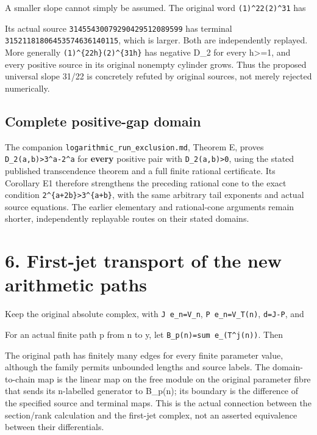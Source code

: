 A smaller slope cannot simply be assumed. The original word
\nolinkurl{(1)^22(2)^31} has


Its actual source \nolinkurl{31455430079290429512089599} has terminal
\nolinkurl{31521181806453574636140115}, which is larger. Both are
independently replayed. More generally
\texttt{(1)\^{}\{22h\}(2)\^{}\{31h\}} has negative D\_2 for every
h\textgreater=1, and every positive source in its original nonempty
cylinder grows. Thus the proposed universal slope 31/22 is concretely
refuted by original sources, not merely rejected numerically.

\subsection{Complete positive-gap domain}

The companion \nolinkurl{logarithmic_run_exclusion.md}, Theorem E,
proves \nolinkurl{D_2(a,b)>3^a-2^a} for \textbf{every} positive pair
with \nolinkurl{D_2(a,b)>0}, using the stated published transcendence
theorem and a full finite rational certificate. Its Corollary E1
therefore strengthens the preceding rational cone to the exact condition
\texttt{2\^{}\{a+2b\}\textgreater{}3\^{}\{a+b\}}, with the same
arbitrary tail exponents and actual source equations. The earlier
elementary and rational-cone arguments remain shorter, independently
replayable routes on their stated domains.

\section{6. First-jet transport of the new arithmetic paths}

Keep the original absolute complex, with \nolinkurl{J e_n=V_n},
\nolinkurl{P e_n=V_T(n)}, \nolinkurl{d=J-P}, and


For an actual finite path p from n to y, let
\nolinkurl{B_p(n)=sum e_(T^j(n))}. Then


The original path has finitely many edges for every finite parameter
value, although the family permits unbounded lengths and source labels.
The domain-to-chain map is the linear map on the free module on the
original parameter fibre that sends its n-labelled generator to B\_p(n);
its boundary is the difference of the specified source and terminal
maps. This is the actual connection between the section/rank calculation
and the first-jet complex, not an asserted equivalence between their
differentials.

